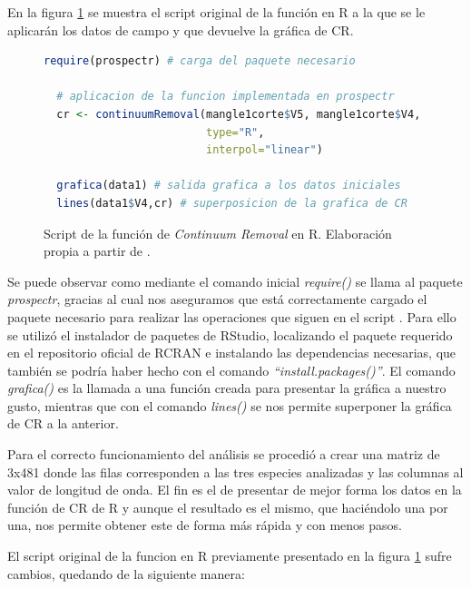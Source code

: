 En la figura \ref{fig:CR} se muestra el script original de la función en R a la que se le aplicarán los datos de campo y que devuelve la gráfica de \ac{CR}.%

\begin{figure}
\centering
\begin{lstlisting}[language = R]
  require(prospectr) # carga del paquete necesario
  
  # aplicacion de la funcion implementada en prospectr 
  cr <- continuumRemoval(mangle1corte$V5, mangle1corte$V4,
                         type="R",
                         interpol="linear")
                         
  grafica(data1) # salida grafica a los datos iniciales
  lines(data1$V4,cr) # superposicion de la grafica de CR
\end{lstlisting}
\caption[Función de \textit{Continuum Removal}]{Script de la función de \textit{Continuum Removal} en R. Elaboración propia a partir de \cite{stevens2014introduction}.}
\label{fig:CR}
\end{figure}

Se puede observar como mediante el comando inicial \textit{require()} se llama al paquete \textit{prospectr}, gracias al cual nos aseguramos que está correctamente cargado el paquete necesario para realizar las operaciones que siguen en el script \citep{stevens2014introduction}. Para ello se utilizó el instalador de paquetes de RStudio, localizando el paquete requerido en el repositorio oficial de RCRAN e instalando las dependencias necesarias, que también se podría haber hecho con el comando \textit{``install.packages()''}. El comando \textit{grafica()} es la llamada a una función creada para presentar la gráfica a nuestro gusto, mientras que con el comando \textit{lines()} se nos permite superponer la gráfica de \ac{CR} a la anterior.%

Para el correcto funcionamiento del análisis se procedió a crear una matriz de 3x481 donde las filas corresponden a las tres especies analizadas y las columnas al valor de longitud de onda. El fin es el de presentar de mejor forma los datos en la función de \ac{CR} de R y aunque el resultado es el mismo, que haciéndolo una por una, nos permite obtener este de forma más rápida y con menos pasos.%

El script original de la funcion en R previamente presentado en la figura \ref{fig:CR} sufre cambios, quedando de la siguiente manera:%

